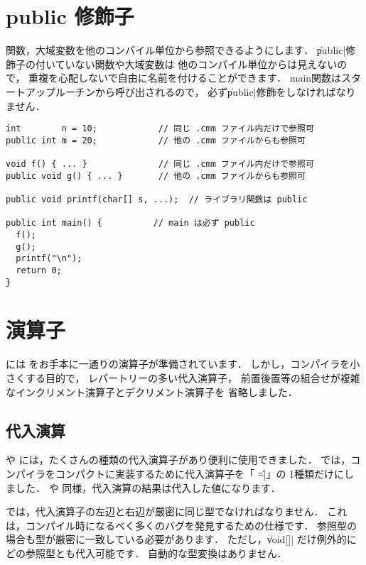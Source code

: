 \section{public 修飾子}

関数，大域変数を他のコンパイル単位から参照できるようにします．
\|public|修飾子の付いていない関数や大域変数は
他のコンパイル単位からは見えないので，
重複を心配しないで自由に名前を付けることができます．
main関数はスタートアップルーチンから呼び出されるので，
必ず\|public|修飾をしなければなりません．

\begin{mylist}
\begin{verbatim}
int        n = 10;            // 同じ .cmm ファイル内だけで参照可
public int m = 20;            // 他の .cmm ファイルからも参照可

void f() { ... }              // 同じ .cmm ファイル内だけで参照可
public void g() { ... }       // 他の .cmm ファイルからも参照可

public void printf(char[] s, ...);  // ライブラリ関数は public

public int main() {          // main は必ず public
  f();
  g();
  printf("\n");
  return 0;
}
\end{verbatim}
\end{mylist}

\section{演算子}

\cmml には \cl をお手本に一通りの演算子が準備されています．
しかし，コンパイラを小さくする目的で，
レパートリーの多い代入演算子，
前置後置等の組合せが複雑なインクリメント演算子とデクリメント演算子を
省略しました．

\subsection{代入演算}

\cl や \javal には，たくさんの種類の代入演算子があり便利に使用できました．
\cmml では，コンパイラをコンパクトに実装するために代入演算子を「 \|=|」の
1種類だけにしました．
\cl や \javal 同様，代入演算の結果は代入した値になります．

\cmml では，代入演算子の左辺と右辺が厳密に同じ型でなければなりません．
これは，コンパイル時になるべく多くのバグを発見するための仕様です．
参照型の場合も型が厳密に一致している必要があります．
ただし，\|void[]| だけ例外的にどの参照型とも代入可能です．
自動的な型変換はありません．

